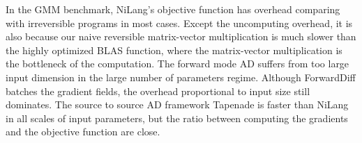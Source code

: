 \documentclass{article}
\newcommand{\<}{\langle}
\renewcommand{\>}{\rangle}
\newcommand{\ra}[1]{\renewcommand{\arraystretch}{#1}}
\theoremstyle{definition}\newtheorem{definition}{\textit{Definition}}
\begin{document}
In the GMM benchmark, NiLang's objective function has overhead comparing with irreversible programs in most cases.
Except the uncomputing overhead, it is also because our naive reversible matrix-vector multiplication is much slower than the highly optimized BLAS function, where the matrix-vector multiplication is the bottleneck of the computation.
The forward mode AD suffers from too large input dimension in the large number of parameters regime.
Although ForwardDiff batches the gradient fields, the overhead proportional to input size still dominates.
The source to source AD framework Tapenade is faster than NiLang in all scales of input parameters,
but the ratio between computing the gradients and the objective function are close.

\begin{table}[h!]\centering
    \scriptsize
\begin{minipage}{\columnwidth}
\ra{1.3}
    \caption{Absolute runtimes in seconds for computing the objective (O) and Jacobians (J) in bundle adjustment.}\label{tbl:ba}
\end{minipage}
\end{table}
\end{document}
